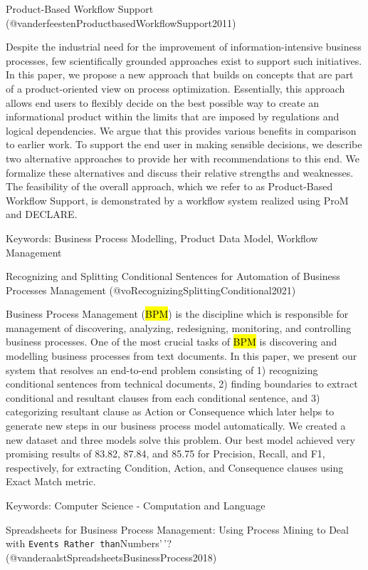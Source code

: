 \documentclass[
  letterpaper,
  DIV=11,
  numbers=noendperiod]{scrartcl}
\begin{document}
Product-Based Workflow Support
(@vanderfeestenProductbasedWorkflowSupport2011)

Despite the industrial need for the improvement of information-intensive
business processes, few scientifically grounded approaches exist to
support such initiatives. In this paper, we propose a new approach that
builds on concepts that are part of a product-oriented view on process
optimization. Essentially, this approach allows end users to flexibly
decide on the best possible way to create an informational product
within the limits that are imposed by regulations and logical
dependencies. We argue that this provides various benefits in comparison
to earlier work. To support the end user in making sensible decisions,
we describe two alternative approaches to provide her with
recommendations to this end. We formalize these alternatives and discuss
their relative strengths and weaknesses. The feasibility of the overall
approach, which we refer to as Product-Based Workflow Support, is
demonstrated by a workflow system realized using ProM and DECLARE.

Keywords: Business Process Modelling, Product Data Model, Workflow
Management

Recognizing and Splitting Conditional Sentences for Automation of
Business Processes Management (@voRecognizingSplittingConditional2021)

Business Process Management (\hl{BPM}) is the discipline which is
responsible for management of discovering, analyzing, redesigning,
monitoring, and controlling business processes. One of the most crucial
tasks of \hl{BPM} is discovering and modelling business processes from
text documents. In this paper, we present our system that resolves an
end-to-end problem consisting of 1) recognizing conditional sentences
from technical documents, 2) finding boundaries to extract conditional
and resultant clauses from each conditional sentence, and 3)
categorizing resultant clause as Action or Consequence which later helps
to generate new steps in our business process model automatically. We
created a new dataset and three models solve this problem. Our best
model achieved very promising results of 83.82, 87.84, and 85.75 for
Precision, Recall, and F1, respectively, for extracting Condition,
Action, and Consequence clauses using Exact Match metric.

Keywords: Computer Science - Computation and Language

Spreadsheets for Business Process Management: Using Process Mining to
Deal with
\texttt{Events\textquotesingle{}\textquotesingle{}\ Rather\ than}Numbers'\,'?
(@vanderaalstSpreadsheetsBusinessProcess2018)
\end{document}
